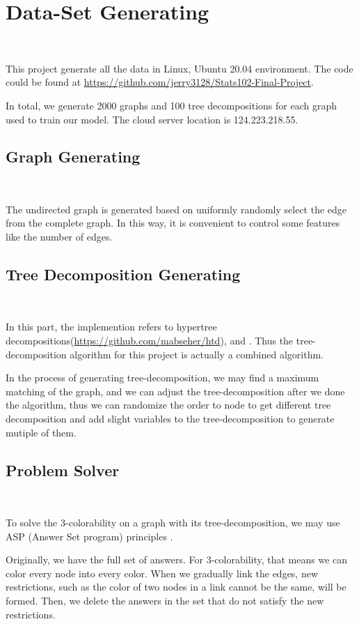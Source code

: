 \section{Data-Set Generating}~\label{sec.DataGen}

This project generate all the data in Linux, Ubuntu 20.04 environment. The code could be found at \url{https://github.com/jerry3128/Stats102-Final-Project}.

In total, we generate 2000 graphs and 100 tree decompositions for each graph used to train our model. The cloud server location is 124.223.218.55.

\subsection{Graph Generating}~\label{sec.DataGen1}

The undirected graph is generated based on uniformly randomly select the edge from the complete graph. In this way, it is convenient to control some features like the number of edges.

\subsection{Tree Decomposition Generating}~\label{sec.DataGen2}

In this part, the implemention refers to hypertree decompositions(\url{https://github.com/mabseher/htd}), and \cite{BHL1996LinearTreeDeomposition}. Thus the tree-decomposition algorithm for this project is actually a combined algorithm.

In the process of generating tree-decomposition, we may find a maximum matching of the graph, and we can adjust the tree-decomposition after we done the algorithm, thus we can randomize the order to node to get different tree decomposition and add slight variables to the tree-decomposition to generate mutiple of them.

\subsection{Problem Solver}~\label{sec.DataGen3}

To solve the 3-colorability on a graph with its tree-decomposition, we may use ASP (Answer Set program) principles \cite{ASP2008}.

Originally, we have the full set of answers. For 3-colorability, that means we can color every node into every color. When we gradually link the edges, new restrictions, such as the color of two nodes in a link cannot be the same, will be formed. Then, we delete the answers in the set that do not satisfy the new restrictions.

